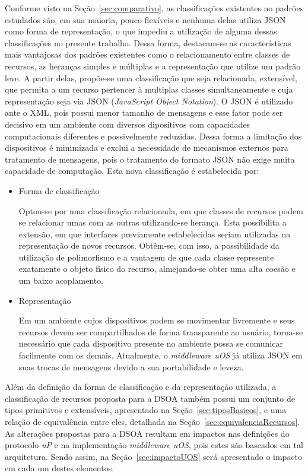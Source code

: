 Conforme visto na Seção~\ref{sec:comparativo}, as classificações existentes no padrões estudados são, em sua maioria, pouco flexíveis e nenhuma delas utiliza JSON como forma de representação, o que impediu a utilização de alguma dessas classificações no presente trabalho. Dessa forma, destacam-se as características mais vantajosas dos padrões existentes como o relacionamento entre classes de recursos, as heranças simples e múltiplas e a representação que utilize um padrão leve. A partir delas, propõe-se uma classificação que seja relacionada, extensível, que permita a um recurso pertencer à multiplas classes simultaneamente e cuja representação seja via JSON (\emph{JavaScript Object Notation}). O JSON é utilizado ante o XML, pois possui menor tamanho de mensagens e esse fator pode ser decisivo em um ambiente com diversos dipositivos com capacidades computacionais diferentes e possivelmente reduzidas. Dessa forma a limitação dos dispositivos é minimizada e exclui a necessidade de mecanismos externos para tratamento de mensagens, pois o tratamento do formato JSON não exige muita capacidade de computação. Esta nova classificação é estabelecida por:

\begin{itemize}
	\item Forma de classificação

	Optou-se por uma classificação relacionada, em que classes de recursos podem se relacionar umas com as outras utilizando-se herança. Esta possibilita a extensão, em que interfaces previamente estabelecidas seriam utilizadas na representação de novos recursos. Obtêm-se, com isso, a possibilidade da utilização de polimorfismo e a vantagem de que cada classe represente exatamente o objeto físico do recurso, almejando-se obter uma alta coesão e um baixo acoplamento.

	\item Representação

	Em um ambiente cujos dispositivos podem se movimentar livremente e seus recursos devem ser compartilhados de forma transparente ao usuário, torna-se necessário que cada dispositivo presente no ambiente possa se comunicar facilmente com os demais. Atualmente, o \emph{middleware uOS} já utiliza JSON em suas trocas de mensagens devido a sua portabilidade e leveza.
\end{itemize}

Além da definição da forma de classificação e da representação utilizada, a classificação de recursos proposta para a DSOA também possui um conjunto de tipos primitivos e extensíveis, apresentado na Seção~\ref{sec:tiposBasicos}, e uma relação de equivalência entre eles, detalhada na Seção~\ref{sec:equivalenciaRecursos}. As alterações propostas para a DSOA resultam em impactos nas definições do protocolo \emph{uP} e na implementação \emph{middleware uOS}, pois estes são baseados em tal arquitetura. Sendo assim, na Seção~\ref{sec:impactoUOS} será apresentado o impacto em cada um destes elementos.

